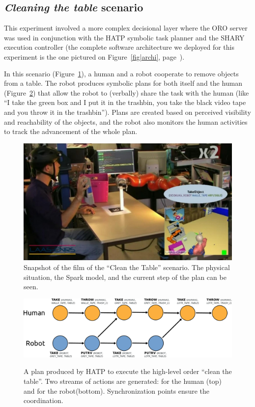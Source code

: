 \documentclass[preprint,3p,times]{elsarticle}
\begin{document}
\subsection{\emph{Cleaning the table} scenario}

This experiment involved a more complex decisional layer where the ORO server
was used in conjunction with the HATP symbolic task planner and the SHARY
execution controller (the complete software architecture we deployed for this
experiment is the one pictured on Figure~\ref{fig|archi},
page~\pageref{fig|archi}).

In this scenario (Figure~\ref{fig|cleantable-video}), a human and a robot
cooperate to remove objects from a table. The robot produces symbolic plans for
both itself and the human (Figure~\ref{plan-etat2})
that allow the robot to (verbally) share the task with the human (like ``I take
the green box and I put it in the trashbin, you take the black video tape and
you throw it in the trashbin''). Plans are created based on perceived
visibility and reachability of the objects, and the robot also monitors the
human activities to track the advancement of the whole plan.

\begin{figure}
    \centering
    \includegraphics[width=0.7\columnwidth]{cleantable.jpg}

    \caption{Snapshot of the film of the ``Clean the Table'' scenario. The
    physical situation, the {\sc Spark} model, and the current step of the plan can
    be seen.}

    \label{fig|cleantable-video}
\end{figure}

\begin{figure}[thpb]
  \centering
  \includegraphics[width=1.0\textwidth]{third_plan.pdf} \\
  \caption {A plan produced by HATP to execute the high-level order ``clean the table''. Two streams of actions are generated: for the human (top) and for the robot(bottom). Synchronization points ensure the coordination.}
  \label{plan-etat2}
\end{figure}
\end{document}
